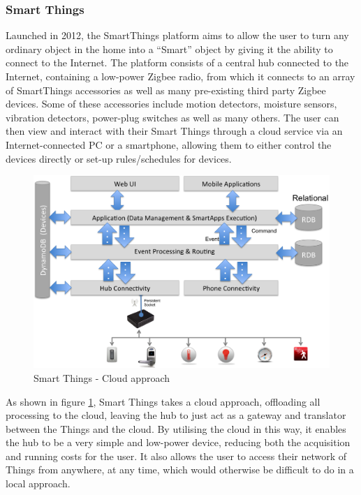 \subsubsection{Smart Things} %
\label{ssub:smart_things}
Launched in 2012, the SmartThings platform aims to allow the user to turn any ordinary object in the home into a ``Smart'' object by giving it the ability to connect to the Internet. The platform consists of a central hub connected to the Internet, containing a low-power Zigbee radio, from which it connects to an array of SmartThings accessories as well as many pre-existing third party Zigbee devices. Some of these accessories include motion detectors, moisture sensors, vibration detectors, power-plug switches as well as many others. The user can then view and interact with their Smart Things through a cloud service via an Internet-connected PC or a smartphone, allowing them to either control the devices directly or set-up rules/schedules for devices.

\begin{figure}[h!]
\centering
    \includegraphics[scale=0.4]{images/smartThingsCloudFirstDiagram.png}
    \caption[]{Smart Things - Cloud approach\footnotemark}
    \label{fig:cloud}
\end{figure}

As shown in figure \ref{fig:cloud}, Smart Things takes a cloud approach, offloading all processing to the cloud, leaving the hub to just act as a gateway and translator between the Things and the cloud. By utilising the cloud in this way, it enables the hub to be a very simple and low-power device, reducing both the acquisition and running costs for the user. It also allows the user to access their network of Things from anywhere, at any time, which would otherwise be difficult to do in a local approach. 

